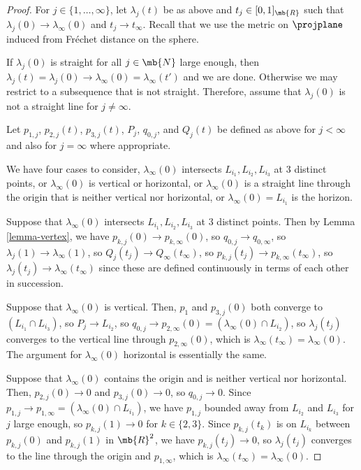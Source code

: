 \begin{proof}
For $j \in \{1,\dots,\infty\}$, let $\lambda_j(t)$ be as above and $t_j \in [0,1]_\mb{R}$ such that $\lambda_j(0) \to \lambda_\infty(0)$ and $t_j \to t_\infty$.
Recall that we use the metric on $\projplane$ induced from Fréchet distance on the sphere.

If $\lambda_j(0)$ is straight for all $j \in \mb{N}$ large enough, then $\lambda_j(t) = \lambda_j(0) \to \lambda_\infty(0) = \lambda_\infty(t')$ and we are done.
Otherwise we may restrict to a subsequence that is not straight.
Therefore, assume that $\lambda_j(0)$ is not a straight line for $j\neq \infty$.

Let $p_{1,j}$, $p_{2,j}(t)$, $p_{3,j}(t)$, $P_j$, $q_{0,j}$, and $Q_{j}(t)$ be defined as above for $j < \infty$ and also for $j=\infty$ where appropriate.

We have four cases to consider, $\lambda_\infty(0)$ intersects $L_{i_1},L_{i_2},L_{i_3}$ at $3$ distinct points, or $\lambda_\infty(0)$ is vertical or horizontal, or $\lambda_\infty(0)$ is a straight line through the origin that is neither vertical nor horizontal, or $\lambda_\infty(0) = L_{i_1}$ is the horizon.

Suppose that $\lambda_\infty(0)$ intersects $L_{i_1},L_{i_2},L_{i_3}$ at $3$ distinct points. Then by Lemma \ref{lemma-vertex}, we have $p_{k,j}(0) \to p_{k,\infty}(0)$, so $q_{0,j} \to q_{0,\infty}$, so $\lambda_j(1) \to \lambda_\infty(1)$, so $Q_{j}(t_j) \to Q_{\infty}(t_\infty)$, so $p_{k,j}(t_j) \to p_{k,\infty}(t_\infty)$, so $\lambda_j(t_j) \to \lambda_\infty(t_\infty)$ since these are defined continuously in terms of each other in succession.

Suppose that $\lambda_\infty(0)$ is vertical. Then, $p_1$ and $p_{3,j}(0)$ both converge to $(L_{i_1} \cap L_{i_3})$, so $P_j \to L_{i_2}$, so $q_{0,j} \to p_{2,\infty}(0) = (\lambda_\infty(0) \cap L_{i_2})$, so $\lambda_j(t_j)$ converges to the vertical line through $p_{2,\infty}(0)$, which is $\lambda_\infty(t_\infty) = \lambda_\infty(0)$.
The argument for $\lambda_\infty(0)$ horizontal is essentially the same.

Suppose that $\lambda_\infty(0)$ contains the origin and is neither vertical nor horizontal. Then, $p_{2,j}(0) \to 0$ and $p_{3,j}(0) \to 0$, so $q_{0,j} \to 0$. Since $p_{1,j} \to p_{1,\infty} = (\lambda_\infty(0) \cap L_{i_1})$, we have $p_{1,j}$ bounded away from $L_{i_2}$ and $L_{i_3}$ for $j$ large enough, so $p_{k,j}(1) \to 0$ for $k \in \{2,3\}$. Since $p_{k,j}(t_k)$ is on $L_{i_k}$ between $p_{k,j}(0)$ and $p_{k,j}(1)$ in $\mb{R}^2$, we have $p_{k,j}(t_j) \to 0$, so $\lambda_j(t_j)$ converges to the line through the origin and $p_{1,\infty}$, which is $\lambda_\infty(t_\infty) = \lambda_\infty(0)$.


\end{proof}
